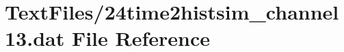 \hypertarget{24time2histsim__channel13_8dat}{}\section{Text\+Files/24time2histsim\+\_\+channel13.dat File Reference}
\label{24time2histsim__channel13_8dat}
